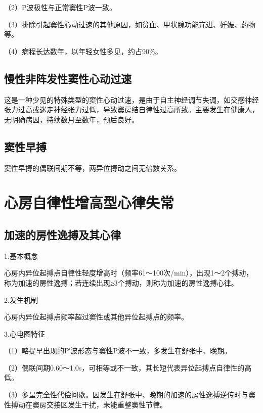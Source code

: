 （2）P波极性与正常窦性P波一致。

（3）排除引起窦性心动过速的其他原因，如贫血、甲状腺功能亢进、妊娠、药物等。

（4）病程长达数年，以年轻女性多见，约占90\%。

\protect\hypertarget{text00022.htmlux5cux23subid260}{}{}

\subsection{慢性非阵发性窦性心动过速}

这是一种少见的特殊类型的窦性心动过速，是由于自主神经调节失调，如交感神经张力过高或迷走神经张力过低，导致窦房结自律性过高所致。主要发生在健康人，无明确病因，持续数月至数年，预后良好。

\protect\hypertarget{text00022.htmlux5cux23subid261}{}{}

\subsection{窦性早搏}

窦性早搏的偶联间期不等，两异位搏动之间无倍数关系。

\protect\hypertarget{text00022.htmlux5cux23subid262}{}{}

\section{心房自律性增高型心律失常}

\protect\hypertarget{text00022.htmlux5cux23subid263}{}{}

\subsection{加速的房性逸搏及其心律}

1.基本概念

心房内异位起搏点自律性轻度增高时（频率61～100次/min），出现1～2个搏动，称为加速的房性逸搏；若连续出现≥3个搏动，则称为加速的房性逸搏心律。

2.发生机制

心房内异位起搏点频率超过窦性或其他异位起搏点的频率。

3.心电图特征

（1）略提早出现的P′波形态与窦性P波不一致，多发生在舒张中、晚期。

（2）偶联间期0.60～1.0s，可相等或不一致，其长短代表异位起搏点自律性的高低。

（3）多呈完全性代偿间歇。因发生在舒张中、晚期的加速的房性逸搏逆传时与窦性搏动在窦房交接区发生干扰，未能重整窦性节律。


